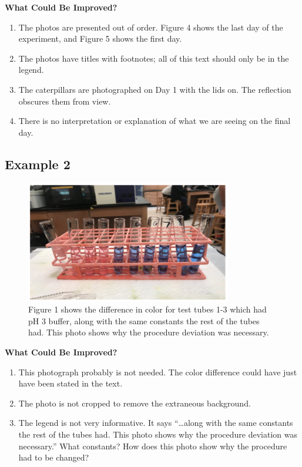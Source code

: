 \documentclass[
]{book}
\providecommand{\tightlist}{%
  \setlength{\itemsep}{0pt}\setlength{\parskip}{0pt}}
\begin{document}
\textbf{What Could Be Improved?}

\begin{enumerate}
\def\labelenumi{\arabic{enumi}.}
\tightlist
\item
  The photos are presented out of order. Figure 4 shows the last day of the experiment, and Figure 5 shows the first day.
\item
  The photos have titles with footnotes; all of this text should only be in the legend.
\item
  The caterpillars are photographed on Day 1 with the lids on. The reflection obscures them from view.
\item
  There is no interpretation or explanation of what we are seeing on the final day.
\end{enumerate}

\hypertarget{example-2-12}{%
\subsection{Example 2}\label{example-2-12}}

\begin{figure}
\centering
\includegraphics[width=0.8\textwidth,height=\textheight]{images/Tubes.png}
\caption{Figure 1 shows the difference in color for test tubes 1-3 which had pH 3 buffer, along with the same constants the rest of the tubes had. This photo shows why the procedure deviation was necessary.}
\end{figure}

\textbf{What Could Be Improved?}

\begin{enumerate}
\def\labelenumi{\arabic{enumi}.}
\tightlist
\item
  This photograph probably is not needed. The color difference could have just have been stated in the text.
\item
  The photo is not cropped to remove the extraneous background.
\item
  The legend is not very informative. It says ``\ldots along with the same constants the rest of the tubes had. This photo shows why the procedure deviation was necessary.'' What constants? How does this photo show why the procedure had to be changed?
\end{enumerate}
\end{document}
